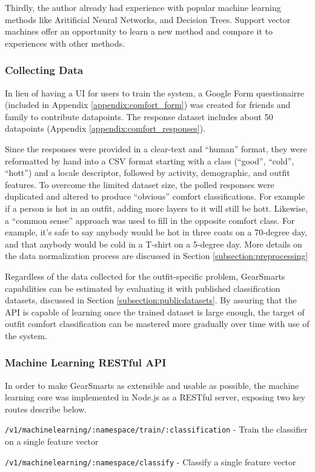 Thirdly, the author already had experience with popular machine learning methods like Aritificial Neural Networks, and
Decision Trees. Support vector machines offer an opportunity to learn a new method and compare it to experiences with
other methods.

\subsubsection{Collecting Data}
In lieu of having a UI for users to train the system, a Google Form questionairre (included in Appendix
\ref{appendix:comfort_form}) was created for
friends and family to contribute datapoints. The response dataset includes about 50 datapoints (Appendix \ref{appendix:comfort_responses}).

Since the responses were provided in a clear-text and ``human'' format, they were reformatted by hand into a CSV format
starting with a class (``good'', ``cold'', ``hott'') and a locale descriptor, followed by activity, demographic, and
outfit features. To overcome the limited dataset size, the polled responses were duplicated and altered to produce ``obvious''
comfort classifications. For example if a person is hot in an outfit, adding more layers to it will still be hott.
Likewise, a ``common sense'' approach was used to fill in the opposite comfort class. For example, it's safe to say anybody
would be hot in three coats on a 70-degree day, and that anybody would be cold in a T-shirt on a 5-degree day.
More details on the data normalization process are discussed in Section \ref{subsection:preprocessing}

Regardless of the data collected for the outfit-specific problem, GearSmarts capabilities can be estimated by evaluating
it with published classification datasets, discussed in Section \ref{subsection:publicdatasets}. By assuring that the API
is capable of learning once the trained dataset is large enough, the target of outfit comfort classification
can be mastered more gradually over time with use of the system.

\subsubsection{Machine Learning RESTful API}
\label{section:mlapi}
In order to make GearSmarts as extensible and usable as possible, the machine learning core was implemented in Node.js
as a RESTful server, exposing two key routes describe below.

\begin{description}
    \item{\texttt{/v1/machinelearning/:namespace/train/:classification}} - Train the classifier on a single feature vector
    \item{\texttt{/v1/machinelearning/:namespace/classify}} - Classify a single feature vector
\end{description}

